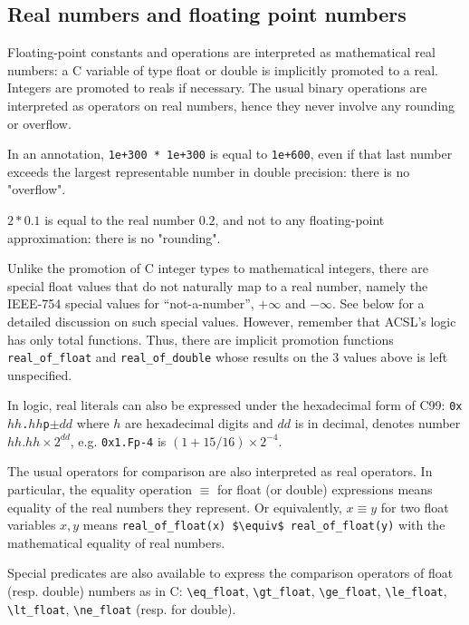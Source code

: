 \subsection{Real numbers and floating point numbers}
\label{sec:floating-point}

Floating-point constants and operations are interpreted as
mathematical real numbers: a C variable of type float or double is
implicitly promoted to a real. Integers are promoted to reals if
necessary. The usual binary operations are interpreted as operators on
real numbers, hence they never involve any rounding or overflow.

\begin{example}
  In an annotation, \lstinline|1e+300 * 1e+300| is equal to
  \lstinline|1e+600|, even if that last number exceeds the largest
  representable number in double precision: there is no "overflow".

  $2 * 0.1$ is equal to the real number $0.2$, and not to any
  floating-point approximation: there is no "rounding".
\end{example}
Unlike the promotion of C integer types to mathematical integers,
there are special float values that do not naturally map to a real
number, namely the IEEE-754 special values for ``not-a-number'',
$+\infty$ and $-\infty$. See below for a detailed discussion on such
special values. However, remember that ACSL's logic has only total
functions. Thus, there are implicit promotion functions
\lstinline|real_of_float| and
\lstinline|real_of_double| whose results on
the 3 values above is left unspecified.

In logic, real literals can also be expressed under the hexadecimal
form of C99: \texttt{0x$hh$.$hh$p$\pm{}dd$} where $h$ are hexadecimal
digits and $dd$ is in decimal, denotes number $hh.hh\times
2^{dd}$, e.g. \texttt{0x1.Fp-4} is $(1+15/16)\times 2^{-4}$.


The usual operators for comparison are also interpreted as real operators.
In particular, the equality operation $\equiv$ for float (or double)
expressions means equality of the real numbers they represent. Or equivalently, $x \equiv y$ for two float
variables $x,y$ means \lstinline|real_of_float(x) $\equiv$ real_of_float(y)|
with the mathematical equality of real
numbers.


Special predicates are also available to express the comparison
operators of float (resp. double) numbers as in C:
\lstinline|\eq_float|,
\lstinline|\gt_float|,
\lstinline|\ge_float|,
\lstinline|\le_float|,
\lstinline|\lt_float|,
\lstinline|\ne_float|
(resp. for double).



